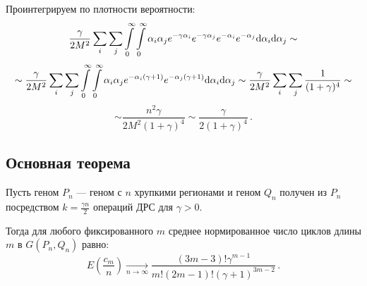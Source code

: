 Проинтегрируем по плотности вероятности:
$$
\frac \gamma {2 M^2} \sum_i \sum_j
\intop_{0}^{\infty} \intop_{0}^{\infty}
\alpha_i \alpha_j e^{- \gamma \alpha_i} e^{- \gamma \alpha_j} e^{- \alpha_i} e^{- \alpha_j}
{\mathrm{d} \alpha_i} {\mathrm{d} \alpha_j} \sim 
$$ $$
\sim \frac \gamma {2 M^2} \sum_i \sum_j
\intop_{0}^{\infty} \intop_{0}^{\infty}
\alpha_i \alpha_j e^{- \alpha_i (\gamma + 1)} e^{- \alpha_j (\gamma + 1)}
{\mathrm{d} \alpha_i} {\mathrm{d} \alpha_j}
\sim \frac \gamma {2 M^2} \sum_i \sum_j
\frac 1 {(1 + \gamma)^4} \sim 
$$ $$
\sim \frac {n^2 \gamma} {2 M^2 (1 + \gamma)^4} \sim \frac {\gamma} {2 (1 + \gamma)^4} \, .
$$

\subsection{Основная теорема}
\begin{theorem}
Пусть геном $P_n$ --- геном с $n$ хрупкими регионами и геном $Q_n$ получен из $P_n$ посредством $k = \frac {\gamma n} 2$ операций ДРС для $\gamma > 0$.

Тогда для любого фиксированного $m$ среднее нормированное число циклов длины $m$ в $G(P_n, Q_n)$ равно:
$$	E \left( \frac {c_m} n \right)
	\xrightarrow[n \to \infty]{}
	\frac
    {(3 m - 3)! \gamma^{m-1}}
    {m! (2 m - 1)! (\gamma + 1) ^ {3 m - 2}} \, .
$$
\end{theorem}
